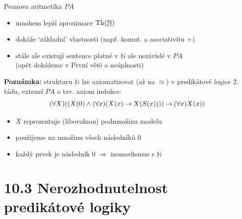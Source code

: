 \documentclass{beamer}
\begin{document}
\begin{frame}{Peanova aritmetika $PA$}    

    \pause

    \pause
    \begin{itemize}
        \item mnohem lepší aproximace $\operatorname{Th}(\underline{\mathbb N})$\pause
        \item dokáže `základní' vlastnosti (např. komut. a asociativitu $+$) \item stále ale existují sentence platné v $\underline{\mathbb N}$ ale nezávislé v $PA$\\(opět dokážeme v První větě o neúplnosti)
    \end{itemize}

    \bigskip

    \pause
    \textbf{Poznámka:} strukturu $\underline{\mathbb N}$ lze axiomatizovat (až na $\simeq$) v predikátové logice \alert{2. řádu}, extenzí $PA$ o tzv. \alert{axiom indukce}:
    $$
    (\forall X)((X(0) \land (\forall x)(X(x) \mathbin{\rightarrow} X(S(x)))) \mathbin{\rightarrow} (\forall x)X(x))
    $$

    \pause
    \begin{itemize}
        \item $X$ reprezentuje (libovolnou) podmnožinu modelu\pause
        \item použijeme na množinu všech následníků 0\pause
        \item každý prvek je následník 0 $\Rightarrow$ izomorfismus s $\underline{\mathbb N}$
    \end{itemize}

\end{frame}


\section{10.3 Nerozhodnutelnost predikátové logiky}
\end{document}
